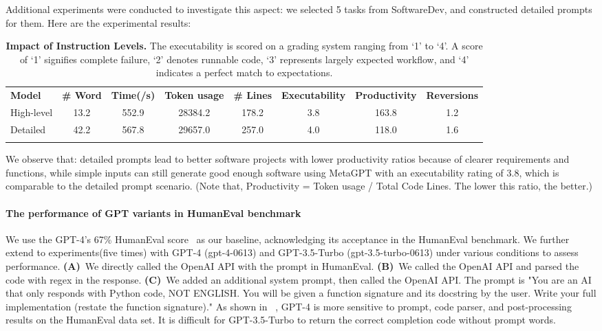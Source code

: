Additional experiments were conducted to investigate this aspect: we selected 5 tasks from SoftwareDev, and constructed detailed prompts for them. Here are the experimental results:
\begin{table}[htb]
  \centering
      \caption{\textbf{Impact of Instruction Levels.} The executability is scored on a grading system ranging from `1' to `4'. A score of `1' signifies complete failure, `2' denotes runnable code, `3' represents largely expected workflow, and `4' indicates a perfect match to expectations.}
      \label{tab:impact_of_instruction_levels}
\renewcommand\tabcolsep{3pt}
\renewcommand\arraystretch{1.2}
\begin{tabular}{l|ccccccc} %
\Xhline{1.5pt}
\rowcolor{paleaqua} 
\textbf{Model} & \textbf{\# Word} & \textbf{Time(/s)} & \textbf{Token usage}& \textbf{\# Lines} & \textbf{Executability} & \textbf{Productivity} & \textbf{Reversions} \\
\Xhline{1.5pt}
High-level&13.2&552.9&28384.2&178.2&3.8 & 163.8 & 1.2 \\
\rowcolor{gray!20} Detailed&42.2&567.8&29657.0&257.0&4.0&118.0 & 1.6 \\
\Xhline{1.5pt}
\end{tabular}
\end{table}

We observe that: detailed prompts lead to better software projects with lower productivity ratios because of clearer requirements and functions, while simple inputs can still generate good enough software using MetaGPT with an executability rating of 3.8, which is comparable to the detailed prompt scenario. (Note that, Productivity = Token usage / Total Code Lines. The lower this ratio, the better.)

\paragraph{The performance of GPT variants in HumanEval benchmark}
We use the GPT-4's 67\% HumanEval score~\citep{openai2023gpt4} as our baseline, acknowledging its acceptance in the HumanEval benchmark. We further extend to experiments(five times) with GPT-4 (gpt-4-0613) and GPT-3.5-Turbo (gpt-3.5-turbo-0613) under various conditions to assess performance. \textbf{(A)}~We directly called the OpenAI API with the prompt in HumanEval. \textbf{(B)}~We called the OpenAI API and parsed the code with regex in the response. \textbf{(C)}~We added an additional system prompt, then called the OpenAI API. The prompt is "You are an AI that only responds with Python code, NOT ENGLISH. You will be given a function signature and its docstring by the user. Write your full implementation (restate the function signature)." As 
shown in ~, GPT-4 is more sensitive to prompt, code parser, and post-processing results on the HumanEval data set. It is difficult for GPT-3.5-Turbo to return the correct completion code without prompt words.


